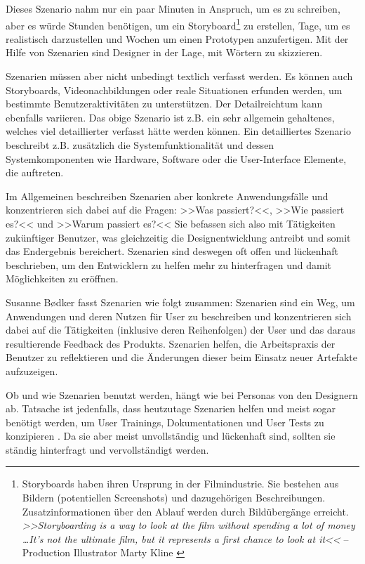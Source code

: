 Dieses Szenario nahm nur ein paar Minuten in Anspruch, um es zu schreiben, aber es würde Stunden benötigen, um ein Storyboard\footnote{Storyboards haben ihren Ursprung in der Filmindustrie. Sie bestehen aus Bildern (potentiellen Screenshots) und dazugehörigen Beschreibungen. Zusatzinformationen über den Ablauf werden durch Bildübergänge  erreicht. \emph{>>Storyboarding is a way to look at the film without spending a lot of money \ldots It’s not the ultimate film, but it represents a first chance to look at it<<} -- Production Illustrator Marty Kline \citep{Braa:1989}}  zu erstellen, Tage, um es realistisch darzustellen und Wochen um einen Prototypen anzufertigen. Mit der Hilfe von Szenarien sind Designer in der Lage, mit Wörtern zu skizzieren. \citep{Saffer:2007} 

\medskip Szenarien müssen aber nicht unbedingt textlich verfasst werden. Es können auch Storyboards, Videonachbildungen oder reale Situationen erfunden werden, um bestimmte Benutzeraktivitäten zu unterstützen. Der Detailreichtum kann ebenfalls variieren. Das obige Szenario ist z.B. ein sehr allgemein gehaltenes, welches viel detaillierter verfasst hätte werden können. Ein detailliertes Szenario beschreibt z.B. zusätzlich die Systemfunktionalität und dessen Systemkomponenten wie Hardware, Software oder die User-Interface Elemente, die auftreten.

\medskip Im Allgemeinen beschreiben Szenarien aber konkrete Anwendungsfälle und konzentrieren sich dabei auf die Fragen: >>Was passiert?<<, >>Wie passiert es?<< und >>Warum passiert es?<< 
Sie befassen sich also mit Tätigkeiten zukünftiger Benutzer, was gleichzeitig die Designentwicklung antreibt und somit das Endergebnis bereichert. Szenarien sind deswegen oft offen und lückenhaft beschrieben, um den Entwicklern zu helfen mehr zu hinterfragen und damit Möglichkeiten zu eröffnen. \citep{Carroll:1995}

\medskip Susanne B{\o}dker fasst Szenarien wie folgt zusammen:
Szenarien sind ein Weg, um Anwendungen und deren Nutzen für User zu beschreiben und konzentrieren sich dabei auf die Tätigkeiten (inklusive deren Reihenfolgen) der User und das daraus resultierende Feedback des Produkts. Szenarien helfen, die Arbeitspraxis der Benutzer zu reflektieren und die Änderungen dieser beim Einsatz neuer Artefakte aufzuzeigen. \citep{Bodker:1991}

\medskip Ob und wie Szenarien benutzt werden, hängt wie bei Personas von den Designern ab. Tatsache ist jedenfalls, dass heutzutage Szenarien helfen und meist sogar benötigt werden, um User Trainings, Dokumentationen und User Tests zu konzipieren \citep{Carroll:1995}. Da sie aber meist unvollständig und lückenhaft sind, sollten sie ständig hinterfragt und vervollständigt werden.
\clearpage


